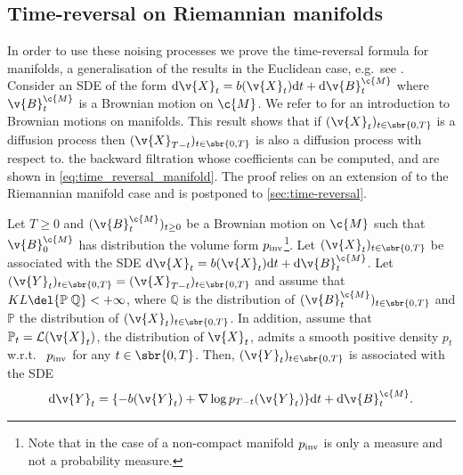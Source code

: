 \subsection{Time-reversal on Riemannian manifolds}
\label{sec:brown-moti-comp}

In order to use these noising processes we prove the time-reversal formula for manifolds, a generalisation of the results in the Euclidean case, e.g.\ see \textcite[Theorem 4.9]{cattiaux2021time}.
Consider an SDE of the form $\mathrm{d} \v{X}_t = b(\v{X}_t) \mathrm{d} t + \mathrm{d} \v{B}_t^\c{M}$ where $\v{B}_t^\c{M}$ is a Brownian motion on $\c{M}$.
We refer to  for an introduction to Brownian motions on manifolds.
This result shows that if $(\v{X}_t)_{t \in \sbr{0,T}}$ is a diffusion process then $(\v{X}_{T-t})_{t \in \sbr{0,T}}$ is also a diffusion process with respect to. the backward filtration whose coefficients can be computed, and are shown in \cref{eq:time_reversal_manifold}.
The proof relies on an extension of \textcite[Theorem 4.9]{cattiaux2021time} to the Riemannian manifold case and is postponed to \cref{sec:time-reversal}.

\begin{theorem}
	\label{thm:time_reversal_manifold}
	Let $T \geq 0$ and $(\v{B}_t^\c{M})_{t \geq 0}$ be a Brownian motion on $\c{M}$ such that $\v{B}_0^\c{M}$ has distribution the volume form $p_{\textup{inv}}$\footnote{Note that in the case of a non-compact manifold $p_{\textup{inv}}$ is only a measure and not a probability measure.
	}.
	Let $(\v{X}_t)_{t \in \sbr{0,T}}$ be associated with the SDE $\mathrm{d} \v{X}_t = b(\v{X}_t) \mathrm{d} t + \mathrm{d} \v{B}_t^\c{M}$.
	Let $(\v{Y}_t)_{t \in \sbr{0,T}} = (\v{X}_{T-t})_{t \in \sbr{0,T}}$ and assume that $KL\del{\mathbb{P}\;\mathbb{Q}} < +\infty$, where $\mathbb{Q}$ is the distribution of $(\v{B}_t^\c{M})_{t \in \sbr{0,T}}$ and $\mathbb{P} $ the distribution of $(\v{X}_t)_{t \in \sbr{0,T}}$.
	In addition, assume that $\mathbb{P}_t=\mathcal{L}(\v{X}_t)$, the distribution of $\v{X}_t$, admits a smooth positive density $p_t$ w.r.t. \ $p_{\textup{inv}}$ for any $t \in \sbr{0,T}$.
	Then, $(\v{Y}_t)_{t \in \sbr{0,T}}$ is associated with the SDE \begin{equation} \label{eq:time_reversal_manifold} \mathrm{d} \v{Y}_t = \{-b(\v{Y}_t) + \nabla \log p_{T-t}(\v{Y}_t)\} \mathrm{d} t + \mathrm{d} \v{B}_t^\c{M}.
	\end{equation}
\end{theorem}

